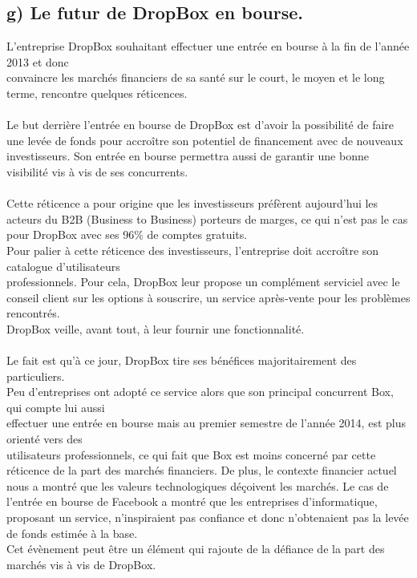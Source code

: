 \documentclass[a4paper, 10pt]{article}
\begin{document}
\subsection*{g) Le futur de DropBox en bourse.}
L'entreprise DropBox souhaitant effectuer une entr\'ee en bourse \`a la fin de l'ann\'ee 2013 et
donc\\convaincre les march\'es financiers de sa sant\'e sur le court, le moyen et le long terme, rencontre quelques r\'eticences.\\ \\
Le but derri\`ere l'entr\'ee en bourse de DropBox est d'avoir la possibilit\'e de faire une lev\'ee de fonds
pour accro\^itre son potentiel de financement avec de nouveaux investisseurs.
Son entr\'ee en bourse permettra aussi de garantir une bonne visibilit\'e vis \`a vis de ses concurrents.\\ \\
Cette r\'eticence a pour origine que les investisseurs pr\'ef\`erent aujourd'hui les acteurs du B2B (Business to Business) porteurs de marges,
ce qui n'est pas le cas pour DropBox avec ses 96\% de comptes gratuits.\\
Pour palier \`a cette r\'eticence des investisseurs, l'entreprise doit accro\^itre son catalogue d'utilisateurs\\professionnels.
Pour cela, DropBox leur propose un compl\'ement serviciel avec le conseil client sur les options \`a souscrire,
un service apr\`es-vente pour les probl\`emes rencontr\'es.\\
DropBox veille, avant tout, \`a leur fournir une fonctionnalit\'e.\\ \\
Le fait est qu'\`a ce jour, DropBox tire ses b\'en\'efices majoritairement des particuliers.\\
Peu d'entreprises ont adopt\'e ce service alors que son principal concurrent Box,
qui compte lui aussi\\effectuer une entr\'ee en bourse mais au premier semestre de l'ann\'ee 2014,
est plus orient\'e vers des\\utilisateurs professionnels,
ce qui fait que Box est moins concern\'e par cette r\'eticence de la part des march\'es financiers.
\newpage
\noindent
De plus, le contexte financier actuel nous a montr\'e que les valeurs technologiques d\'eçoivent les march\'es.
Le cas de l'entr\'ee en bourse de Facebook a montr\'e que les entreprises d'informatique, proposant un service,
n'inspiraient pas confiance et donc n'obtenaient pas la lev\'ee de fonds estim\'ee \`a la base.\\
Cet \'ev\`enement peut \^etre un \'el\'ement qui rajoute de la d\'efiance de la part des march\'es vis \`a vis de DropBox.
\end{document}
